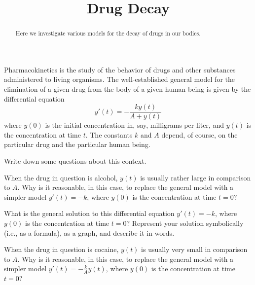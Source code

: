 \documentclass{ximera}
\title{Drug Decay}
\begin{document}
\begin{abstract}
Here we investigate various models for the decay of drugs in our bodies.  
\end{abstract}
\maketitle

Pharmacokinetics is the study of the behavior of drugs and other substances administered to living organisms.  
The well-established general model for 
the elimination of a given drug from the body of a given human being is given by the differential equation 
$$y'(t)=-\frac{ky(t)}{A+y(t)}$$
where $y(0)$ is the initial concentration in, say, milligrams per liter, and $y(t)$ is the concentration at time $t$.  The constants $k$ and $A$ depend, of course, on the particular drug and the particular human being. 

\begin{question}
Write down some questions about this context.       
\begin{freeResponse}
\end{freeResponse}
\end{question}


\begin{question}
When the drug in question is alcohol, $y(t)$ is usually rather large in comparison to $A$.   Why is it reasonable, in this case, to replace the general model with a simpler model $y'(t)=-k$, where $y(0)$ is the concentration at time $t=0$?  
\begin{freeResponse}
\end{freeResponse}
\end{question}


\begin{question}
What is the general solution to this differential equation $y'(t)=-k$, where $y(0)$ is the concentration at time $t=0$?   Represent your solution symbolically (i.e., as a formula), as a graph, and describe it in words.  
\begin{freeResponse}
\end{freeResponse}
\end{question}


\begin{question}
When the drug in question is cocaine, $y(t)$ is usually very small in comparison to $A$.   Why is it reasonable, in this case, to replace the general model with a simpler model $y'(t)=-\frac{k}{A}y(t)$, where $y(0)$ is the concentration at time $t=0$?  
\begin{freeResponse}
\end{freeResponse}
\end{question}
\end{document}
